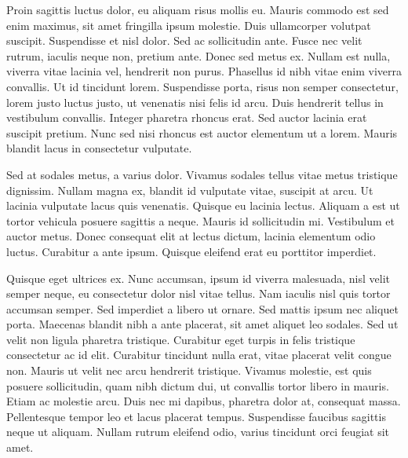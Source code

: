 Proin sagittis luctus dolor, eu aliquam risus mollis eu. Mauris commodo est sed enim maximus, sit amet fringilla ipsum molestie. Duis ullamcorper volutpat suscipit. Suspendisse et nisl dolor. Sed ac sollicitudin ante. Fusce nec velit rutrum, iaculis neque non, pretium ante. Donec sed metus ex. Nullam est nulla, viverra vitae lacinia vel, hendrerit non purus. Phasellus id nibh vitae enim viverra convallis. Ut id tincidunt lorem. Suspendisse porta, risus non semper consectetur, lorem justo luctus justo, ut venenatis nisi felis id arcu. Duis hendrerit tellus in vestibulum convallis. Integer pharetra rhoncus erat. Sed auctor lacinia erat suscipit pretium. Nunc sed nisi rhoncus est auctor elementum ut a lorem. Mauris blandit lacus in consectetur vulputate.\par

Sed at sodales metus, a varius dolor. Vivamus sodales tellus vitae metus tristique dignissim. Nullam magna ex, blandit id vulputate vitae, suscipit at arcu. Ut lacinia vulputate lacus quis venenatis. Quisque eu lacinia lectus. Aliquam a est ut tortor vehicula posuere sagittis a neque. Mauris id sollicitudin mi. Vestibulum et auctor metus. Donec consequat elit at lectus dictum, lacinia elementum odio luctus. Curabitur a ante ipsum. Quisque eleifend erat eu porttitor imperdiet.\par

Quisque eget ultrices ex. Nunc accumsan, ipsum id viverra malesuada, nisl velit semper neque, eu consectetur dolor nisl vitae tellus. Nam iaculis nisl quis tortor accumsan semper. Sed imperdiet a libero ut ornare. Sed mattis ipsum nec aliquet porta. Maecenas blandit nibh a ante placerat, sit amet aliquet leo sodales. Sed ut velit non ligula pharetra tristique. Curabitur eget turpis in felis tristique consectetur ac id elit. Curabitur tincidunt nulla erat, vitae placerat velit congue non. Mauris ut velit nec arcu hendrerit tristique. Vivamus molestie, est quis posuere sollicitudin, quam nibh dictum dui, ut convallis tortor libero in mauris. Etiam ac molestie arcu. Duis nec mi dapibus, pharetra dolor at, consequat massa. Pellentesque tempor leo et lacus placerat tempus. Suspendisse faucibus sagittis neque ut aliquam. Nullam rutrum eleifend odio, varius tincidunt orci feugiat sit amet.\par

